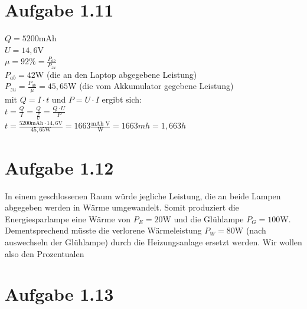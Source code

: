 \documentclass[]{article}
\newcommand{\unit}[1]{\text{#1}}
\newcommand{\fracunit}[2]{\frac{\unit{#1}}{\unit{#2}}}
\begin{document}
\section*{Aufgabe 1.11}
\par
	$Q = 5200\unit{mAh}$\\
	$U = 14,6\unit{V}$\\
	$\mu = 92\% = \frac{P_{ab}}{P_{zu}}$\\
	$P_{ab} = 42\unit{W}$ (die an den Laptop abgegebene Leistung)\\
	$P_{zu} = \frac{P_{ab}}{\mu} = 45,65\unit{W}$ (die vom Akkumulator gegebene Leistung)\\
	mit $Q = I \cdot t$ und $P = U \cdot I$ ergibt sich:\\
	$t = \frac{Q}{I} = \frac{Q}{\frac{P}{U}} = \frac{Q \cdot U}{P}$\\
	$t = \frac{5200\unit{mAh} \cdot 14,6\unit{V}}{45,65\unit{W}} = 1663\fracunit{mAh V}{W} = 1663mh = 1,663h$

\section*{Aufgabe 1.12}
\par
	In einem geschlossenen Raum würde jegliche Leistung, die an beide Lampen abgegeben werden in Wärme umgewandelt. Somit produziert die Energiesparlampe eine Wärme von $P_E = 20\unit{W}$ und die Glühlampe $P_G = 100\unit{W}$. Dementsprechend müsste die verlorene Wärmeleistung $P_W = 80\unit{W}$ (nach auswechseln der Glühlampe) durch die Heizungsanlage ersetzt werden. Wir wollen also den Prozentualen

\section*{Aufgabe 1.13}
\par
\end{document}
